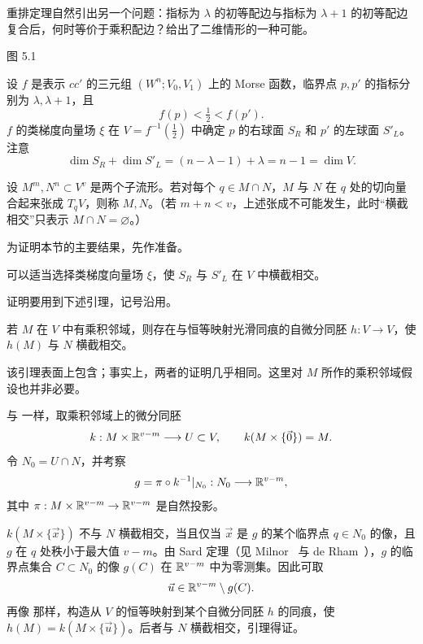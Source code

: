 
重排定理自然引出另一个问题：指标为 $\lambda$ 的初等配边与指标为 $\lambda+1$ 的初等配边复合后，何时等价于乘积配边？给出了二维情形的一种可能。

\begin{center}
  \FigFiveOne

  \label{fig:5.1}图 5.1
\end{center}

\label{sec5:page45-setup}设 $f$ 是表示 $cc'$ 的三元组 $(W^n;V_0,V_1)$ 上的 Morse 函数，临界点 $p,p'$ 的指标分别为 $\lambda,\lambda+1$，且
\[
  f(p)<\tfrac12<f(p').
\]
$f$ 的类梯度向量场 $\xi$ 在 $V=f^{-1}(\tfrac12)$ 中确定 $p$ 的右球面 $S_R$ 和 $p'$ 的左球面 $S'_L$。注意
\[
  \dim S_R+\dim S'_L=(n-\lambda-1)+\lambda=n-1=\dim V.
\]

设 $M^m,N^n\subset V^v$ 是两个子流形。若对每个 $q\in M\cap N$，$M$ 与 $N$ 在 $q$ 处的切向量合起来张成 $T_qV$，则称 $M,N$\emph{}。（若 $m+n<v$，上述张成不可能发生，此时“横截相交”只表示 $M\cap N=\varnothing$。）

为证明本节的主要结果，先作准备。

可以适当选择类梯度向量场 $\xi$，使 $S_R$ 与 $S'_L$ 在 $V$ 中横截相交。

证明要用到下述引理，记号沿用。

若 $M$ 在 $V$ 中有乘积邻域，则存在与恒等映射光滑同痕的自微分同胚 $h:V\to V$，使 $h(M)$ 与 $N$ 横截相交。

\Remark 该引理表面上包含；事实上，两者的证明几乎相同。这里对 $M$ 所作的乘积邻域假设也并非必要。

\Proof 与 一样，取乘积邻域上的微分同胚
\[
  k:M\times\mathbb{R}^{v-m}\longrightarrow U\subset V,
  \qquad k(M\times\{\vec0\})=M.
\]
令 $N_0=U\cap N$，并考察
\[
  g=\pi\circ k^{-1}|_{N_0}:N_0\longrightarrow\mathbb{R}^{v-m},
\]
其中 $\pi:M\times\mathbb{R}^{v-m}\to\mathbb{R}^{v-m}$ 是自然投影。

$k(M\times\{\vec x\})$ 不与 $N$ 横截相交，当且仅当 $\vec x$ 是 $g$ 的某个临界点 $q\in N_0$ 的像，且 $g$ 在 $q$ 处秩小于最大值 $v-m$。由 Sard 定理（见 Milnor~\cite[p.~10]{ref10} 与 de Rham~\cite[p.~10]{ref01}），$g$ 的临界点集合 $C\subset N_0$ 的像 $g(C)$ 在 $\mathbb{R}^{v-m}$ 中为零测集。因此可取
\[
  \vec u\in\mathbb{R}^{v-m}\setminus g(C).
\]
再像 那样，构造从 $V$ 的恒等映射到某个自微分同胚 $h$ 的同痕，使 $h(M)=k(M\times\{\vec u\})$。后者与 $N$ 横截相交，引理得证。
\EndProof



